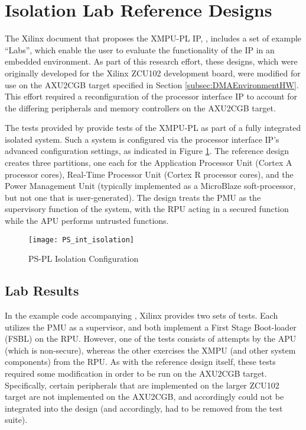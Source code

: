 \section{Isolation Lab Reference Designs}\label{sec:DMAIsolationLab}
The Xilinx document that proposes the XMPU-PL IP, \cite{noauthor_memory_2021}, includes a set of example ``Labs'', which enable the user to evaluate the functionality of the IP in an embedded environment. As part of this research effort, these designs, which were originally developed for the Xilinx ZCU102 development board, were modified for use on the AXU2CGB target specified in Section \ref{subsec:DMAEnvironmentHW}. This effort required a reconfiguration of the processor interface IP to account for the differing peripherals and memory controllers on the AXU2CGB target.

The tests provided by \cite{noauthor_memory_2021} provide tests of the XMPU-PL as part of a fully integrated isolated system. Such a system is configured via the processor interface IP's advanced configuration settings, as indicated in Figure \ref{fig:PS_int_isolation}. The reference design creates three partitions, one each for the Application Processor Unit (Cortex A processor cores), Real-Time Processor Unit (Cortex R processor cores), and the Power Management Unit (typically implemented as a MicroBlaze soft-processor, but not one that is user-generated). The design treats the PMU as the supervisory function of the system, with the RPU acting in a secured function while the APU performs untrusted functions.

\begin{figure}[h]
    \centering
    \texttt{[image: PS\_int\_isolation]}
    \caption{PS-PL Isolation Configuration}
    \label{fig:PS_int_isolation}
\end{figure}

\subsection{Lab Results}

In the example code accompanying \cite{noauthor_memory_2021}, Xilinx provides two sets of tests. Each utilizes the PMU as a supervisor, and both implement a First Stage Boot-loader (FSBL) on the RPU. However, one of the tests consists of attempts by the APU (which is non-secure), whereas the other exercises the XMPU (and other system components) from the RPU. As with the reference design itself, these tests required some modification in order to be run on the AXU2CGB target. Specifically, certain peripherals that are implemented on the larger ZCU102 target are not implemented on the AXU2CGB, and accordingly could not be integrated into the design (and accordingly, had to be removed from the test suite). 

